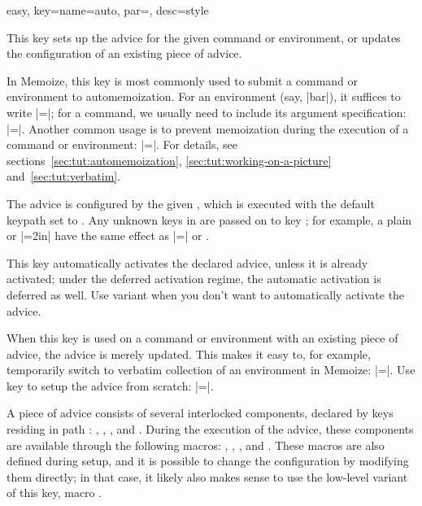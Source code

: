 \documentclass[a4paper,11pt]{article}
\begin{document}
\begin{doc}{easy,
    key={name=auto, par=, desc=style}}
  
  This key sets up the advice for the given command or environment, or updates
  the configuration of an existing piece of advice.

  In Memoize, this key is most commonly used to submit a command or environment
  to automemoization.  For an environment (say, |bar|), it suffices to write
  |=|; for a command,
  we usually need to include its argument specification:
  |=\foo|.  Another common usage is to prevent
  memoization during the execution of a command or environment:
  |=|.  For
  details, see sections~\ref{sec:tut:automemoization},
  \ref{sec:tut:working-on-a-picture} and~\ref{sec:tut:verbatim}.

  The advice is configured by the given , which is executed with
  the default keypath set to .  Any unknown keys in
   are passed on to key ; for example, a
  plain  or |=2in| have the same effect as
  |=| or
  .

  This key automatically activates the declared advice, unless it is already
  activated; under the deferred activation regime, the automatic activation is
  deferred as well. Use variant  when you don't want to
  automatically activate the advice.

  When this key is used on a command or environment with an existing piece of advice,
  the advice is merely updated.  This makes it easy to, for example,
  temporarily switch to verbatim collection of an environment in Memoize:
  |=|.  Use key
   to setup the advice from scratch:
  |=|.
  
  A piece of advice consists of several interlocked components, declared by keys
  residing in path : ,
  , ,
   and .  During the execution
  of the advice, these components are available through the following macros:
  , ,
  ,  and
  .  These macros are also defined during setup, and
  it is possible to change the configuration by modifying them directly; in
  that case, it likely also makes sense to use the low-level variant of this
  key, macro .


\end{doc}
\end{document}
